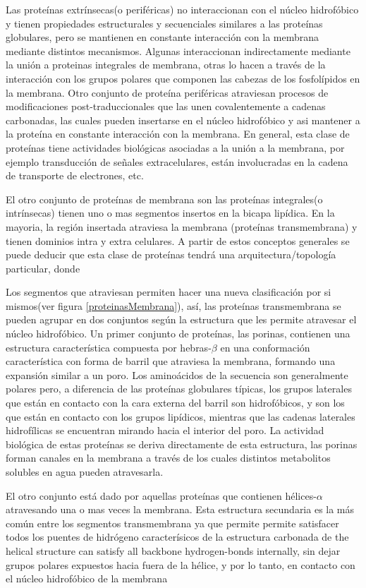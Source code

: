 Las proteínas extrínsecas(o periféricas) no interaccionan con el núcleo hidrofóbico y tienen propiedades estructurales y secuenciales similares a las proteínas globulares, 
pero se mantienen en constante interacción con la membrana mediante distintos mecanismos.
Algunas interaccionan indirectamente mediante la unión a proteinas integrales de membrana, otras lo hacen a través de la interacción con los grupos polares que componen las cabezas de los fosfolípidos en la membrana. 
Otro conjunto de proteína periféricas atraviesan procesos de modificaciones post-traduccionales que las unen covalentemente a cadenas carbonadas, las cuales pueden insertarse en el núcleo hidrofóbico y
asi mantener a la proteína en constante interacción con la membrana.
En general, esta clase de proteínas tiene actividades biológicas asociadas a la unión a la membrana, por ejemplo transducción de señales extracelulares, están involucradas en la cadena de transporte de electrones, etc.

El otro conjunto de proteínas de membrana son las proteínas integrales(o intrínsecas) tienen uno o mas segmentos insertos en la bicapa lipídica.
En la mayoria, la región insertada atraviesa la membrana (proteínas transmembrana) y tienen dominios intra y extra celulares.
A partir de estos conceptos generales se puede deducir que esta clase de proteínas tendrá una arquitectura/topología particular, donde 

Los segmentos que atraviesan permiten hacer una nueva clasificación por si mismos(ver figura \ref{proteinasMembrana}), así, las proteínas transmembrana se pueden agrupar en dos conjuntos según la estructura que les permite atravesar el núcleo hidrofóbico.
Un primer conjunto de proteínas, las porinas, contienen una estructura característica compuesta por hebras-$\beta$ en una conformación característica con forma de barril que atraviesa la membrana, formando una expansión similar a un poro.
Los aminoácidos de la secuencia son generalmente polares pero, a diferencia de las proteínas globulares típicas, los grupos laterales que están en contacto con la cara externa del barril son hidrofóbicos, y son los que están en contacto con 
los grupos lipídicos, mientras que las cadenas laterales hidrofílicas se encuentran mirando hacia el interior del poro.
La actividad biológica de estas proteínas se deriva directamente de esta estructura, las porinas forman canales en la membrana a través de los cuales distintos metabolitos solubles en agua pueden atravesarla. 

El otro conjunto está dado por aquellas proteínas que contienen hélices-$\alpha$ atravesando una o mas veces la membrana. 
Esta estructura secundaria es la más común entre los segmentos transmembrana ya que permite permite satisfacer todos los puentes de hidrógeno caracterísicos de la estructura carbonada de
the helical structure can satisfy all backbone hydrogen-bonds internally, 
sin dejar grupos polares expuestos hacia fuera de la hélice, y por lo tanto, en contacto con el núcleo hidrofóbico de la membrana

